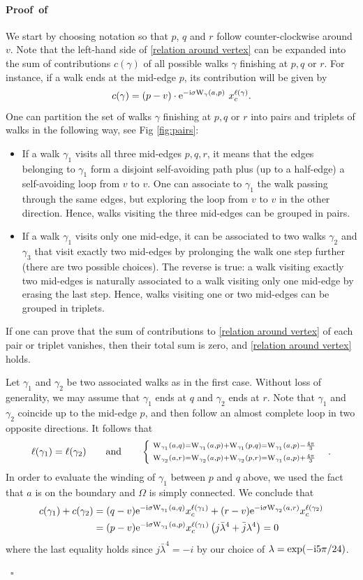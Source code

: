 \documentclass[a4paper,oneside,12pt]{article}
\newcommand{\g}{\gamma}
\newcommand{\e}{{\rm e}}
\newcommand{\I}{{\rm i}}
\newcommand{\W}{{\rm W}}
\newenvironment{proof}[1][\relax]%
  {\paragraph{Proof\ifx#1\relax\else~of #1\fi}}%
  {~\hfill$\square$\par\bigskip}
\begin{document}
\begin{proof}
We start by choosing notation so that $p$, $q$ and $r$ 
follow counter-clockwise around $v$. 
Note that the left-hand side of \eqref{relation around vertex}
can be expanded into the sum of contributions $c(\g)$ 
of all possible walks $\g$ finishing at $p,q$ or $r$. 
For instance, if a walk ends at the mid-edge $p$, its contribution 
will be given by
$$c(\g)=(p-v)\cdot \e^{-\I\sigma \W_{\g}(a,p)}~x_c^{\ell(\g)}.$$
One can partition the set of walks $\g$ finishing at $p,q$ or $r$ into pairs and triplets of walks in the following way, see Fig \ref{fig:pairs}:
\begin{itemize}
\item If a walk $\g_1$ visits all three mid-edges $p,q,r$, it means that the edges belonging to $\g_1$ form a disjoint self-avoiding path plus (up to a half-edge) a self-avoiding loop from $v$ to $v$. One can associate to $\g_1$ the walk passing through the same edges, but exploring the loop from $v$ to $v$ in the other direction. Hence, walks visiting the three mid-edges can be grouped in pairs.

\item If a walk $\g_1$ visits only one mid-edge, it can be associated to two walks $\g_2$ and $\g_3$ that visit exactly two mid-edges by prolonging the walk one step further (there are two possible choices). The reverse is true: a walk visiting exactly two mid-edges is naturally associated to a walk visiting only one mid-edge by erasing the last step. Hence, walks visiting one or two mid-edges can be grouped in triplets.
\end{itemize}
If one can prove that the sum of contributions to \eqref{relation around vertex}
of each pair or triplet vanishes, then their total sum is zero, and \eqref{relation around vertex} holds. 

Let $\g_1$ and $\g_2$ be two associated walks as in the first case. 
Without loss of generality, we may assume that $\g_1$ ends at $q$ and $\g_2$ ends at $r$. Note that $\g_1$ and $\g_2$ coincide up to the mid-edge $p$,
and then follow an almost complete loop in two opposite directions.
It follows that
$$\ell(\g_1)=\ell(\g_2)\quad\quad \text{and}\quad \quad \left\{\ \substack{
	\W_{\g_1}(a,q)=\W_{\g_1}(a,p)+\W_{\g_1}(p,q)=\W_{\g_1}(a,p)-\frac{4\pi}{3}\\ \ \\
	\W_{\g_2}(a,r)=\W_{\g_2}(a,p)+\W_{\g_2}(p,r)=\W_{\g_1}(a,p)+\frac{4\pi}{3}}\right.\quad.$$
In order to evaluate the winding of $\g_1$ between $p$ and $q$ above, 
we used the fact that $a$ is on the boundary and $\Omega$ is simply connected. 
We conclude that
\begin{align*}c(\g_1)+c(\g_2)&=(q-v)\e^{-\I\sigma \W_{\g_1}(a,q)} x_c^{\ell(\g_1)}+(r-v)\e^{-\I\sigma \W_{\g_2}(a,r)} x_c^{\ell(\g_2)}\\
&=(p-v)\e^{-\I\sigma \W_{\g_1}(a,p)}x_c^{\ell(\g_1)}\left(j\bar{\lambda}^4+\bar{j}\lambda^4\right)=0
\end{align*}
where the last equality holds since $j\bar{\lambda}^4=-i$  by our choice
of $\lambda=\exp (-\I5\pi/24)$. 


\end{proof}
\end{document}
